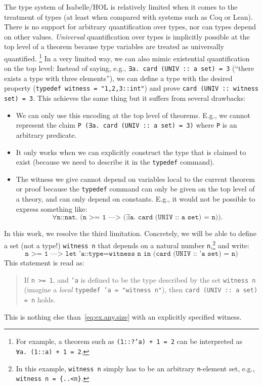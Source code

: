 \documentclass[11pt,a4paper]{article}
\begin{document}
The type system of Isabelle/HOL is relatively limited when it comes to the treatment of types (at least when compared with systems such as Coq or Lean).
There is no support for arbitrary quantification over types, nor can types depend on other values.
\emph{Universal} quantification over types is implicitly possible at the top level of a theorem because type variables are treated as universally quantified.%
\footnote{For example, a theorem such as \texttt{(1::?'a) + 1 = 2} can be interpreted as \texttt{∀a.~(1::a) + 1 = 2}.}
In a very limited way, we can also mimic existential quantification on the top level:
Instead of saying, e.g., \texttt{∃a.~card (UNIV ::~a set) = 3} (``there exists a type with three elements''),
we can define a type with the desired property (\texttt{typedef witness = "{1,2,3::int}"}) and prove \texttt{card (UNIV ::~witness set) = 3}. This achieves the same thing but it suffers from several drawbacks:
\begin{itemize}
\item We can only use this encoding at the top level of theorems. E.g., we cannot represent the claim \texttt{P (∃a.~card (UNIV ::~a set) = 3)} where \texttt{P} is an arbitrary predicate.
\item It only works when we can explicitly construct the type that is claimed to exist (because we need to describe it in the \texttt{typedef} command).
\item The witness we give cannot depend on variables local to the current theorem or proof because the \texttt{typedef} command can only be given on the top level of a theory, and can only depend on constants.
  E.g., it would not be possible to express something like:
  \begin{equation}\label{eq:ex.any.size}
    \texttt{∀n::nat. (n >= 1 ---> (∃a.~card (UNIV ::~a set) = n))}.
  \end{equation}
\end{itemize}
In this work, we resolve the third limitation.
Concretely, we will be able to define a set (not a type!) \texttt{witness n} that depends on a natural number \texttt{n},\footnote{In this example, \texttt{witness n} simply has to be an arbitrary \texttt{n}-element set, e.g., \texttt{witness n = \{..<n\}}.}
and write:
\[
\texttt{n >= 1 ---> let 'a::type=witness n in (card (UNIV ::~'a set) = n)} 
\]
This statement is read as:
\begin{quote}
  If \texttt{n >= 1}, and \texttt{'a} is defined to be the type described by the set \texttt{witness n}
  (imagine a \emph{local} \texttt{typedef 'a = "witness n"}), then \texttt{card (UNIV ::~a set) = n} holds.
\end{quote}
This is nothing else than~\eqref{eq:ex.any.size} with an explicitly specified witness.
\end{document}
